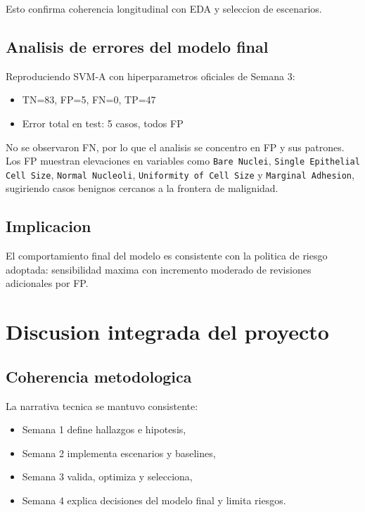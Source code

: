 \documentclass[11pt,a4paper]{article}
\begin{document}
Esto confirma coherencia longitudinal con EDA y seleccion de escenarios.

\subsection{Analisis de errores del modelo final}

Reproduciendo SVM-A con hiperparametros oficiales de Semana 3:

\begin{itemize}[leftmargin=1.2cm]
\item TN=83, FP=5, FN=0, TP=47
\item Error total en test: 5 casos, todos FP
\end{itemize}

No se observaron FN, por lo que el analisis se concentro en FP y sus patrones. Los FP muestran elevaciones en variables como \texttt{Bare Nuclei}, \texttt{Single Epithelial Cell Size}, \texttt{Normal Nucleoli}, \texttt{Uniformity of Cell Size} y \texttt{Marginal Adhesion}, sugiriendo casos benignos cercanos a la frontera de malignidad.

\subsection{Implicacion}

El comportamiento final del modelo es consistente con la politica de riesgo adoptada: sensibilidad maxima con incremento moderado de revisiones adicionales por FP.

\section{Discusion integrada del proyecto}

\subsection{Coherencia metodologica}

La narrativa tecnica se mantuvo consistente:

\begin{itemize}[leftmargin=1.2cm]
\item Semana 1 define hallazgos e hipotesis,
\item Semana 2 implementa escenarios y baselines,
\item Semana 3 valida, optimiza y selecciona,
\item Semana 4 explica decisiones del modelo final y limita riesgos.
\end{itemize}
\end{document}
